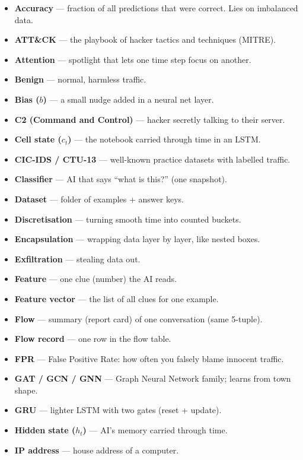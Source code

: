 \documentclass[11pt,a4paper]{article}
\begin{document}
\begin{itemize}[leftmargin=1.4em,itemsep=1pt]
  \item \textbf{Accuracy} --- fraction of all predictions that were correct. Lies on imbalanced data.
  \item \textbf{ATT\&CK} --- the playbook of hacker tactics and techniques (MITRE).
  \item \textbf{Attention} --- spotlight that lets one time step focus on another.
  \item \textbf{Benign} --- normal, harmless traffic.
  \item \textbf{Bias ($b$)} --- a small nudge added in a neural net layer.
  \item \textbf{C2 (Command and Control)} --- hacker secretly talking to their server.
  \item \textbf{Cell state ($c_t$)} --- the notebook carried through time in an LSTM.
  \item \textbf{CIC-IDS / CTU-13} --- well-known practice datasets with labelled traffic.
  \item \textbf{Classifier} --- AI that says ``what is this?'' (one snapshot).
  \item \textbf{Dataset} --- folder of examples + answer keys.
  \item \textbf{Discretisation} --- turning smooth time into counted buckets.
  \item \textbf{Encapsulation} --- wrapping data layer by layer, like nested boxes.
  \item \textbf{Exfiltration} --- stealing data out.
  \item \textbf{Feature} --- one clue (number) the AI reads.
  \item \textbf{Feature vector} --- the list of all clues for one example.
  \item \textbf{Flow} --- summary (report card) of one conversation (same 5-tuple).
  \item \textbf{Flow record} --- one row in the flow table.
  \item \textbf{FPR} --- False Positive Rate: how often you falsely blame innocent traffic.
  \item \textbf{GAT / GCN / GNN} --- Graph Neural Network family; learns from town shape.
  \item \textbf{GRU} --- lighter LSTM with two gates (reset + update).
  \item \textbf{Hidden state ($h_t$)} --- AI's memory carried through time.
  \item \textbf{IP address} --- house address of a computer.

\end{itemize}
\end{document}

